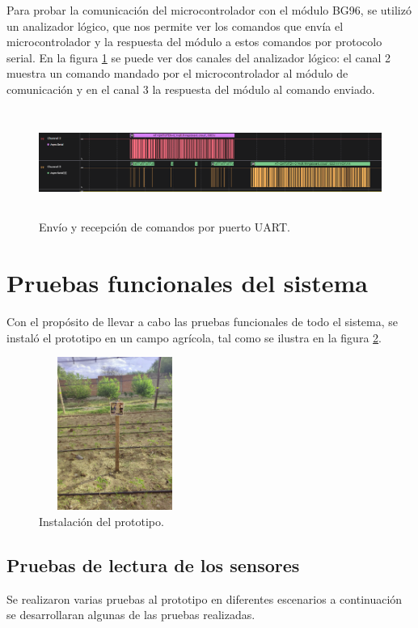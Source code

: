 Para probar la comunicación del microcontrolador con el módulo BG96, se utilizó un analizador lógico, que nos permite ver los comandos que envía el microcontrolador y la respuesta del módulo a estos comandos por protocolo serial.
En la figura \ref{fig:trama uart1} se puede ver dos canales del analizador  lógico: el canal 2 muestra un comando mandado por el microcontrolador al módulo de comunicación y en el canal 3 la respuesta del módulo al comando enviado.

\begin{figure}[h!]
  \centering
    \includegraphics[width=\linewidth, height=3.5cm]{./Figures/trama_uart1.png}
  \caption{Envío y recepción de comandos por puerto UART.}
    \label{fig:trama uart1}
\end{figure}

\section{Pruebas funcionales del sistema}
Con el propósito de llevar a cabo las pruebas funcionales de todo el sistema, se instaló el prototipo en un campo agrícola, tal como se ilustra en la figura \ref{fig:Condicionales ambientales prueba 1}.
\begin{figure}[h!]
  \centering
    \includegraphics[width=5cm, height=5cm]{./Figures/prototipo_implementacion.png}
  \caption{Instalación del prototipo.}
    \label{fig:Condicionales ambientales prueba 1}
\end{figure}
  
\subsection{Pruebas de lectura de los sensores}
Se realizaron varias pruebas al prototipo en diferentes escenarios a continuación se desarrollaran algunas de las pruebas realizadas.
